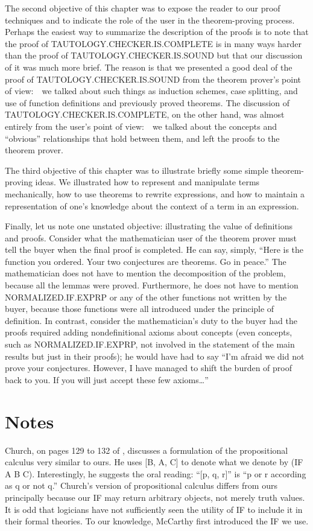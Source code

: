 \documentclass[10pt]{book}
\begin{document}
The second objective of this chapter was to expose the
reader to our proof techniques and to indicate the role of the user in the
theorem-proving process.  Perhaps the easiest way to summarize
the description of the proofs is to note that
the proof of TAUTOLOGY.CHECKER.IS.COMPLETE
is in many ways harder than the proof of TAUTOLOGY.CHECKER.IS.SOUND
but that our discussion of it was much more brief.  The reason is that we
presented a good deal of the proof of TAUTOLOGY.CHECKER.IS.SOUND
from the theorem prover's
point of view:~~we talked about such things as induction schemes,
case splitting, and use of function definitions and previously proved theorems.
The discussion of TAUTOLOGY.CHECKER.IS.COMPLETE, on the other hand, was almost
entirely from the user's point of view:~~we talked about the concepts
and ``obvious'' relationships that hold between them, and left the proofs to
the theorem prover.

The third objective of this chapter was to
illustrate briefly some simple theorem-proving ideas.  We illustrated how to
represent  and manipulate terms mechanically, how to use theorems to rewrite
expressions, and how to  maintain a representation of one's knowledge about
the context of a term in an expression.

Finally, let us note one unstated objective: illustrating the value of definitions
and proofs.  Consider what the mathematician user of the theorem
prover must tell the buyer when the final proof is completed.
He can say, simply, ``Here is the function you ordered.
Your two conjectures are theorems.  Go in peace.''  The mathematician
does not have to mention the decomposition of the problem, because all
the lemmas were proved.  Furthermore, he does not have to mention
NORMALIZED.IF.EXPRP or any of the other functions not written
by the buyer, because those functions were all
introduced under the principle of definition.  In contrast, consider
the mathematician's duty to the buyer had the proofs required adding
nondefinitional axioms about concepts (even concepts, such as NORMALIZED.IF.EXPRP,
not involved in the statement of the main results but just in their proofs);
he would have had to say ``I'm afraid we did not
prove your conjectures.  However, I have managed to shift the burden of proof
back to you.  If you will just accept these few axioms\ldots{}''

\section{Notes}
Church, on pages 129 to 132 of
\cite{CHURCH}, discusses a formulation of the propositional
calculus very similar to ours.  He uses [B, A, C] to
denote what we denote by (IF A B C).  Interestingly, he
suggests the oral reading: ``[p, q, r]'' is ``p or r according as
q or not q.''  Church's version of propositional calculus differs
from ours principally because our IF may return arbitrary
objects, not merely truth values.  It is odd that logicians
have not sufficiently seen the utility of IF to include
it in their formal theories.  To our knowledge, McCarthy \cite{MCCARTHYBASIS}
first introduced the IF we use.
\end{document}
